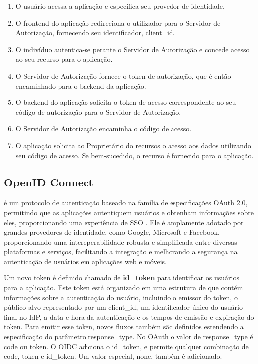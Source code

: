 \begin{enumerate}

    \item O usuário acessa a aplicação e especifica seu provedor de identidade.
    
    \item O frontend do aplicação redireciona o utilizador para o Servidor de Autorização, fornecendo seu identificador, client\_id.
    
    \item O indivíduo autentica-se perante o Servidor de Autorização e concede acesso ao seu recurso para o aplicação.
    
    \item O Servidor de Autorização fornece o token de autorização, que é então encaminhado para o backend da aplicação.
    
    \item O backend do aplicação solicita o token de acesso correspondente ao seu código de autorização para o Servidor de Autorização.
    
    \item O Servidor de Autorização encaminha o código de acesso.
     
    \item O aplicação solicita ao Proprietário do recursos o acesso aos dados utilizando seu código de acesso. Se bem-sucedido, o recurso é fornecido para o aplicação.

    
\end{enumerate}

\subsection{OpenID Connect}\label{subsec:OIDC}

 é um protocolo de autenticação baseado na família de especificações OAuth 2.0, permitindo que as aplicações autentiquem usuários e obtenham informações sobre eles, proporcionando uma experiência de \acs{SSO} \cite{openid}. Ele é amplamente adotado por grandes provedores de identidade, como Google, Microsoft e Facebook, proporcionando uma interoperabilidade robusta e simplificada entre diversas plataformas e serviços, facilitando a integração e melhorando a segurança na autenticação de usuários em aplicações web e móveis.

Um novo token é definido chamado de \textbf{id\_token} para identificar os usuários para a aplicação. Este token está organizado em uma estrutura de  que contém informações sobre a autenticação do usuário, incluindo o emissor do token, o público-alvo representado por um client\_id, um identificador único do usuário final no IdP, a data e hora da autenticação e os tempos de emissão e expiração do token. Para emitir esse token, novos fluxos também são definidos estendendo a especificação do parâmetro response\_type. No OAuth o valor de response\_type é code ou token. O \acs{OIDC} adiciona o id\_token, e permite qualquer combinação de code, token e id\_token. Um valor especial, none, também é adicionado. 

